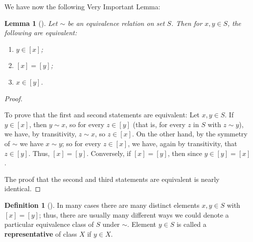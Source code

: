 \documentclass[10pt,]{book}
\newcommand{\terminology}[1]{\textbf{#1}}
\theoremstyle{plain}
\newtheorem{lemma}[theorem]{Lemma}
\theoremstyle{definition}
\newtheorem{definition}[theorem]{Definition}
\theoremstyle{definition}
\theoremstyle{definition}
\theoremstyle{definition}
\numberwithin{equation}{section}
\begin{document}
We have now the following Very Important Lemma:%
\begin{lemma}[{}]\label{vil_lem}
Let \(\sim\) be an equivalence relation on set \(S\). Then for \(x,y\in S\), the following are equivalent: \leavevmode%
\begin{enumerate}
\item\hypertarget{li-402}{}\(y\in [x]\);%
\item\hypertarget{li-403}{}\([x]=[y]\);%
\item\hypertarget{li-404}{}\(x\in [y]\).%
\end{enumerate}
%
%
\end{lemma}
\begin{proof}\hypertarget{proof-35}{}
To prove that the first and second statements are equivalent: Let \(x, y\in S\). If \(y\in
[x]\), then \(y \sim x\), so for every \(z\in [y]\) (that is, for every \(z\) in \(S\) with \(z\sim y\)), we have, by transitivity, \(z\sim x\), so \(z\in [x]\). On the other hand, by the symmetry of \(\sim\) we have \(x\sim y\); so for every \(z\in [x]\), we have, again by transitivity, that \(z\in [y]\). Thus, \([x]=[y]\). Conversely, if \([x]=[y]\), then since \(y\in [y]=[x]\).%
\par
The proof that the second and third statements are equivalent is nearly identical.%
\end{proof}
\begin{definition}[{}]\label{definition-59}
In many cases there are many distinct elements \(x,y\in S\) with \([x]=[y]\); thus, there are usually many different ways we could denote a particular equivalence class of \(S\) under \(\sim\). Element \(y\in S\) is called a \terminology{representative} of class \(X\) if \(y\in X\).%
\end{definition}
\end{document}

